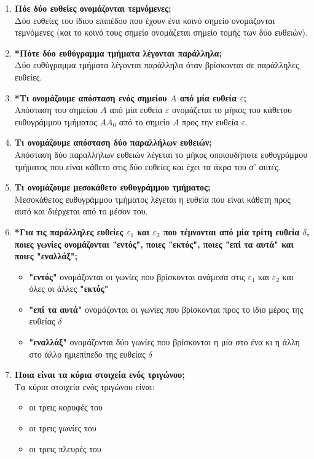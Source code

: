 \documentclass[a4paper,11pt]{report}
\begin{document}
\begin{enumerate}
\item \textbf{Πόε δύο ευθείες ονομάζονται τεμνόμενες;}\\
      Δύο ευθείες του ίδιου επιπέδου που έχουν ένα κοινό σημείο ονομάζονται τεμνόμενες (και το κοινό τους 
      σημείο ονομάζεται σημείο τομής των δύο ευθειών).
\item \textbf{*Πότε δύο ευθύγραμμα τμήματα λέγονται παράλληλα;}\\
      Δύο ευθύγραμμα τμήματα λέγονται παράλληλα όταν βρίσκονται σε παράλληλες ευθείες.
\item \textbf{*Τι ονομάζουμε απόσταση ενός σημείου $Α$ από μία ευθεία $ε$;}\\
      Απόσταση του σημείου $Α$ από μία ευθεία $ε$ ονομάζεται το μήκος του κάθετου ευθυγράμμου τμήματος $ΑΑ_{0}$
      από το σημείο $Α$ προς την ευθεία $ε$.
\item \textbf{Τι ονομάζουμε απόσταση δύο παραλλήλων ευθειών;}\\
      Απόσταση δύο παραλλήλων ευθειών λέγεται το μήκος οποιουδήποτε ευθυγράμμου τμήματος που είναι κάθετο στις δύο ευθείες 
      και έχει τα άκρα του σ' αυτές.
\item \textbf{Τι ονομάζουμε μεσοκάθετο ευθυγράμμου τμήματος;}\\
      Μεσοκάθετος ευθυγράμμου τμήματος λέγεται η ευθεία που είναι κάθετη προς αυτό και διέρχεται από το μέσον του.
\item \textbf{*Για τις παράλληλες ευθείες $ε_{1}$ και $ε_{2}$ που τέμνονται από μία τρίτη ευθεία $δ$,
       ποιες γωνίες ονομάζονται "εντός", ποιες "εκτός", ποιες "επί τα αυτά" και ποιες "εναλλάξ";}\\
       \begin{itemize}
        \item \textbf{"εντός"} ονομάζονται οι γωνίες που βρίσκονται ανάμεσα στις $ε_{1}$ και $ε_{2}$ και όλες 
              οι άλλες \textbf{"εκτός"}
        \item \textbf{"επί τα αυτά"} ονομάζονται οι γωνίες που βρίσκονται προς το ίδιο μέρος της ευθείας $δ$
        \item \textbf{"εναλλάξ"} ονομάζονται δύο γωνίες που βρίσκονται η μία στο ένα κι η άλλη στο άλλο ημιεπίπεδο 
               της ευθείας $δ$
       \end{itemize}

\item \textbf{Ποια είναι τα κύρια στοιχεία ενός τριγώνου;}\\
      Τα κύρια στοιχεία ενός τριγώνου είναι: 
      \begin{itemize}
       \item οι τρεις κορυφές του
       \item οι τρεις γωνίες του
       \item οι τρεις πλευρές του
      \end{itemize}


\end{enumerate}
\end{document}

